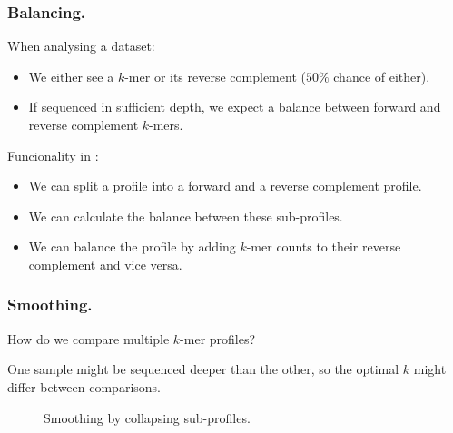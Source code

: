 \documentclass[slidestop]{beamer}
\begin{document}
\begin{frame}
  \frametitle{Balancing.}

  When analysing a dataset:
  \begin{itemize}
    \item We either see a $k$-mer or its reverse complement ($50\%$ chance of
      either).
    \item If sequenced in sufficient depth, we expect a balance between forward
      and reverse complement $k$-mers.
  \end{itemize}
  \bigskip
  \pause

  Funcionality in :
  \begin{itemize}
    \item We can split a profile into a forward and a reverse complement
      profile.
    \item We can calculate the balance between these sub-profiles.
    \item We can balance the profile by adding $k$-mer counts to their reverse
      complement and vice versa.
  \end{itemize}
\end{frame}

\begin{frame}
  \frametitle{Smoothing.}

  How do we compare multiple $k$-mer profiles?
  \medskip

  One sample might be sequenced deeper than the other, so the optimal $k$ might
  differ between comparisons.
  \pause

  \begin{figure}
    \caption{Smoothing by collapsing sub-profiles.}
  \end{figure}
\end{frame}
\end{document}
